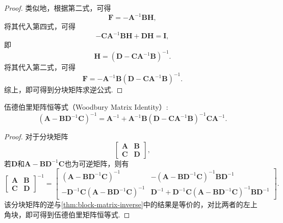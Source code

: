 \begin{proof}
    类似地，根据第二式，可得
    \[
        \mathbf{F} = -\mathbf{A}^{-1}\mathbf{B}\mathbf{H},
    \]
    将其代入第四式，可得
    \[
        -\mathbf{C}\mathbf{A}^{-1}\mathbf{B}\mathbf{H} + \mathbf{D}\mathbf{H} = \mathbf{I},
    \]
    即
    \begin{equation}
        \mathbf{H} = (\mathbf{D} - \mathbf{C}\mathbf{A}^{-1}\mathbf{B})^{-1}.
    \end{equation}
    将其代入第二式，可得
    \begin{equation}
        \mathbf{F} = -\mathbf{A}^{-1}\mathbf{B}(\mathbf{D} - \mathbf{C}\mathbf{A}^{-1}\mathbf{B})^{-1}.
    \end{equation}
    综上，即可得到分块矩阵求逆公式.
\end{proof}

\begin{corollary}\label{cor:woodbury-matrix-identity}
    伍德伯里矩阵恒等式（Woodbury Matrix Identity）:
    \[
        (\mathbf{A} - \mathbf{B}\mathbf{D}^{-1}\mathbf{C})^{-1} = \mathbf{A}^{-1} + \mathbf{A}^{-1}\mathbf{B}(\mathbf{D} - \mathbf{C}\mathbf{A}^{-1}\mathbf{B})^{-1}\mathbf{C}\mathbf{A}^{-1}.
    \]
\end{corollary}
\begin{proof}
    对于分块矩阵
    \[
        \begin{bmatrix}
            \mathbf{A} & \mathbf{B} \\
            \mathbf{C} & \mathbf{D}
        \end{bmatrix},
    \]
    若\( \mathbf{D} \)和\( \mathbf{A} - \mathbf{B}\mathbf{D}^{-1}\mathbf{C} \)也为可逆矩阵，则有
    \[
        \begin{bmatrix}
            \mathbf{A} & \mathbf{B} \\
            \mathbf{C} & \mathbf{D}
        \end{bmatrix}^{-1} = \begin{bmatrix}
            (\mathbf{A} - \mathbf{B}\mathbf{D}^{-1}\mathbf{C})^{-1}                           & -(\mathbf{A} - \mathbf{B}\mathbf{D}^{-1}\mathbf{C})^{-1}\mathbf{B}\mathbf{D}^{-1}                                           \\
            -\mathbf{D}^{-1}\mathbf{C}(\mathbf{A} - \mathbf{B}\mathbf{D}^{-1}\mathbf{C})^{-1} & \mathbf{D}^{-1} + \mathbf{D}^{-1}\mathbf{C}(\mathbf{A} - \mathbf{B}\mathbf{D}^{-1}\mathbf{C})^{-1}\mathbf{B}\mathbf{D}^{-1}
        \end{bmatrix}.
    \]
    该分块矩阵的逆与\cref{thm:block-matrix-inverse}中的结果是等价的，对比两者的左上角块，即可得到伍德伯里矩阵恒等式.
\end{proof}



